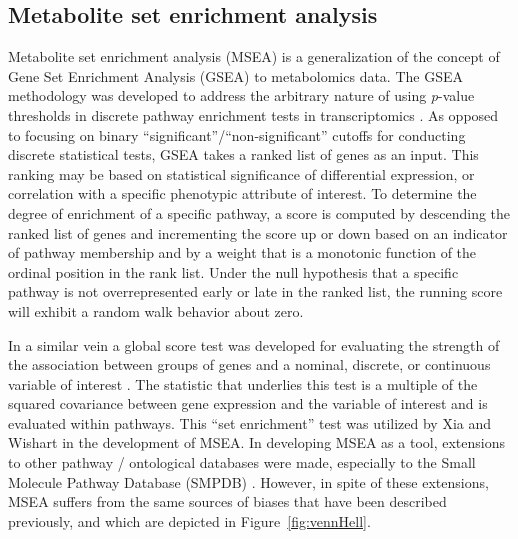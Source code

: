 \begin{DoubleSpace*}
\section{Metabolite set enrichment analysis}
Metabolite set enrichment analysis (MSEA)\cite{xia2010b} is a generalization of the concept of Gene Set Enrichment Analysis (GSEA) \cite{mootha2003,subramanian2005} to metabolomics data. The GSEA methodology was developed to address the arbitrary nature of using \emph{p}-value thresholds in discrete pathway enrichment tests in transcriptomics \cite{subramanian2005}. As opposed to focusing on binary ``significant''/``non-significant'' cutoffs for conducting discrete statistical tests, GSEA takes a ranked list of genes as an input. This ranking may be based on statistical significance of differential expression, or correlation with a specific phenotypic attribute of interest. To determine the degree of enrichment of a specific pathway, a score is computed by descending the ranked list of genes and incrementing the score up or down based on an indicator of pathway membership and by a weight that is a monotonic function of the ordinal position in the rank list. Under the null hypothesis that a specific pathway is not overrepresented early or late in the ranked list, the running score will exhibit a random walk behavior about zero.

In a similar vein a global score test was developed for evaluating the strength of the association between groups of genes and a nominal, discrete, or continuous variable of interest \cite{goeman2003}. The statistic that underlies this test is a multiple of the squared covariance between gene expression and the variable of interest and is evaluated within pathways. This ``set enrichment'' test was utilized by Xia and Wishart \cite{xia2010b} in the development of MSEA. In developing MSEA as a tool, extensions to other pathway / ontological databases were made, especially to the Small Molecule Pathway Database (SMPDB) \cite{frolkis2010}. However, in spite of these extensions, MSEA suffers from the same sources of biases that have been described previously, and which are depicted in Figure~\ref{fig:vennHell}.


\end{DoubleSpace*}
